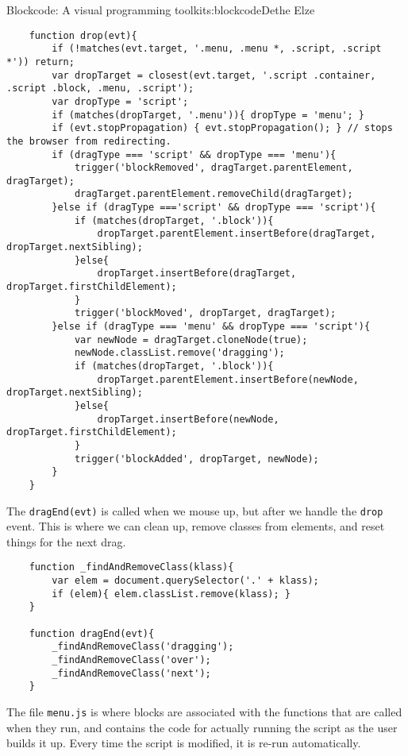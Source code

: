 \begin{aosachapter}{Blockcode: A visual programming toolkit}{s:blockcode}{Dethe Elze}
\begin{verbatim}
    function drop(evt){
        if (!matches(evt.target, '.menu, .menu *, .script, .script *')) return;
        var dropTarget = closest(evt.target, '.script .container, .script .block, .menu, .script');
        var dropType = 'script';
        if (matches(dropTarget, '.menu')){ dropType = 'menu'; }
        if (evt.stopPropagation) { evt.stopPropagation(); } // stops the browser from redirecting.
        if (dragType === 'script' && dropType === 'menu'){
            trigger('blockRemoved', dragTarget.parentElement, dragTarget);
            dragTarget.parentElement.removeChild(dragTarget);
        }else if (dragType ==='script' && dropType === 'script'){
            if (matches(dropTarget, '.block')){
                dropTarget.parentElement.insertBefore(dragTarget, dropTarget.nextSibling);
            }else{
                dropTarget.insertBefore(dragTarget, dropTarget.firstChildElement);
            }
            trigger('blockMoved', dropTarget, dragTarget);
        }else if (dragType === 'menu' && dropType === 'script'){
            var newNode = dragTarget.cloneNode(true);
            newNode.classList.remove('dragging');
            if (matches(dropTarget, '.block')){
                dropTarget.parentElement.insertBefore(newNode, dropTarget.nextSibling);
            }else{
                dropTarget.insertBefore(newNode, dropTarget.firstChildElement);
            }
            trigger('blockAdded', dropTarget, newNode);
        }
    }
\end{verbatim}

The \texttt{dragEnd(evt)} is called when we mouse up, but after we
handle the \texttt{drop} event. This is where we can clean up, remove
classes from elements, and reset things for the next drag.

\begin{verbatim}
    function _findAndRemoveClass(klass){
        var elem = document.querySelector('.' + klass);
        if (elem){ elem.classList.remove(klass); }
    }

    function dragEnd(evt){
        _findAndRemoveClass('dragging');
        _findAndRemoveClass('over');
        _findAndRemoveClass('next');
    }
\end{verbatim}

\label{menu.js}

The file \texttt{menu.js} is where blocks are associated with the
functions that are called when they run, and contains the code for
actually running the script as the user builds it up. Every time the
script is modified, it is re-run automatically.


\end{aosachapter}
